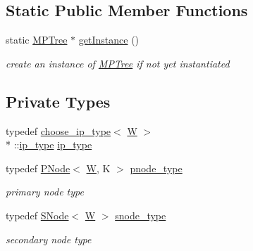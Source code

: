 \subsection*{Static Public Member Functions}
\begin{DoxyCompactItemize}
\item 
static \hyperlink{classMPTree}{M\-P\-Tree} $\ast$ \hyperlink{classMPTree_a5a2cae4534f201ebaddf348141c4b835}{get\-Instance} ()
\begin{DoxyCompactList}\small\item\em create an instance of \hyperlink{classMPTree}{M\-P\-Tree} if not yet instantiated \end{DoxyCompactList}\end{DoxyCompactItemize}
\subsection*{Private Types}
\begin{DoxyCompactItemize}
\item 
typedef \hyperlink{types_8h_structchoose__ip__type}{choose\-\_\-ip\-\_\-type}$<$ \hyperlink{test__u128_8cpp_ab21b528bc38899d04d3a7053e52fb797}{W} $>$\\*
\-::\hyperlink{classMPTree_a11032357a52017ffa6ad4e7ddedf3c23}{ip\-\_\-type} \hyperlink{classMPTree_a11032357a52017ffa6ad4e7ddedf3c23}{ip\-\_\-type}
\item 
typedef \hyperlink{structPNode}{P\-Node}$<$ \hyperlink{test__u128_8cpp_ab21b528bc38899d04d3a7053e52fb797}{W}, K $>$ \hyperlink{classMPTree_aaccc544aa2a8703f51ca45951f37a279}{pnode\-\_\-type}
\begin{DoxyCompactList}\small\item\em primary node type \end{DoxyCompactList}\item 
typedef \hyperlink{structSNode}{S\-Node}$<$ \hyperlink{test__u128_8cpp_ab21b528bc38899d04d3a7053e52fb797}{W} $>$ \hyperlink{classMPTree_a456aa661f3322ceae1d38bfbb39b572c}{snode\-\_\-type}
\begin{DoxyCompactList}\small\item\em secondary node type \end{DoxyCompactList}\end{DoxyCompactItemize}
